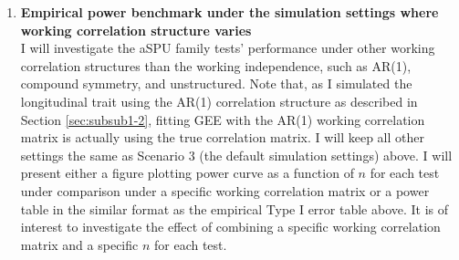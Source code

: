 \documentclass[12pt]{article}
\begin{document}
\begin{enumerate}
%
%

\item \textbf{Empirical power benchmark under the simulation settings where working correlation structure varies}\\
I will investigate the aSPU family tests' performance under other working correlation structures than the working independence, such as AR(1), compound symmetry, and unstructured. Note that, as I simulated the longitudinal trait using the AR(1) correlation structure as described in Section \ref{sec:subsub1-2}, fitting GEE with the AR(1) working correlation matrix is actually using the true correlation matrix. I will keep all other settings the same as Scenario 3 (the default simulation settings) above. I will present either a figure plotting power curve as a function of $n$ for each test under comparison under a specific working correlation matrix or a power table in the similar format as the empirical Type I error table above. It is of interest to investigate the effect of combining a specific working correlation matrix and a specific $n$ for each test. 
\end{enumerate}
 
\end{document}
